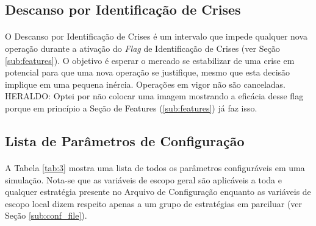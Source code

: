 \FloatBarrier
\subsection{Descanso por Identificação de Crises}
\label{sub:crisis_halt}

\paragraph{} O Descanso por Identificação de Crises é um intervalo que impede qualquer nova operação durante a ativação do \textit{Flag} de Identificação de Crises (ver Seção \ref{sub:features}). O objetivo é esperar o mercado se estabilizar de uma crise em potencial para que uma nova operação se justifique, mesmo que esta decisão implique em uma pequena inércia. Operações em vigor não são canceladas. \color{red} HERALDO: Optei por não colocar uma imagem mostrando a eficácia desse flag porque em princípio a Seção de Features (\ref{sub:features}) já faz isso. 



\FloatBarrier
\subsection{Lista de Parâmetros de Configuração}
\label{sub:params_list}

\paragraph{} A Tabela \ref{tab:3} mostra uma lista de todos os parâmetros configuráveis em uma simulação. Nota-se que as variáveis de escopo geral são aplicáveis a toda e qualquer estratégia presente no Arquivo de Configuração enquanto as variáveis de escopo local dizem respeito apenas a um grupo de estratégias em parciluar (ver Seção \ref{sub:conf_file}).

